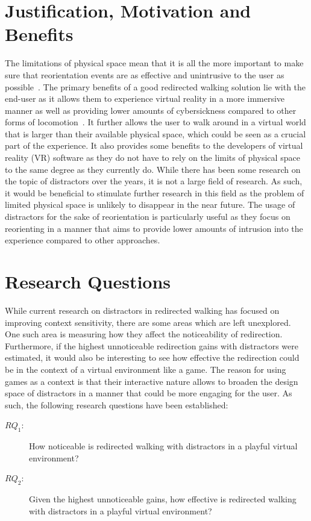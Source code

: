 \section{Justification, Motivation and Benefits}
The limitations of physical space mean that it is all the more important to make sure that reorientation events are as effective and unintrusive to the user as possible~\cite{azmandian2015physical}. The primary benefits of a good redirected walking solution lie with the end-user as it allows them to experience virtual reality in a more immersive manner as well as providing lower amounts of cybersickness compared to other forms of locomotion~\cite{razzaque2001redirected, peck2011evaluation}. It further allows the user to walk around in a virtual world that is larger than their available physical space, which could be seen as a crucial part of the experience. It also provides some benefits to the developers of virtual reality (VR) software as they do not have to rely on the limits of physical space to the same degree as they currently do. While there has been some research on the topic of distractors over the years, it is not a large field of research. As such, it would be beneficial to stimulate further research in this field as the problem of limited physical space is unlikely to disappear in the near future. The usage of distractors for the sake of reorientation is particularly useful as they focus on reorienting in a manner that aims to provide lower amounts of intrusion into the experience compared to other approaches.

\section{Research Questions}\label{research:questions}
While current research on distractors in redirected walking has focused on improving context sensitivity, there are some areas which are left unexplored. One such area is measuring how they affect the noticeability of redirection. Furthermore, if the highest unnoticeable redirection gains with distractors were estimated, it would also be interesting to see how effective the redirection could be in the context of a virtual environment like a game. The reason for using games as a context is that their interactive nature allows to broaden the design space of distractors in a manner that could be more engaging for the user. As such, the following research questions have been established:
\begin{description}
\item[$RQ_1$: ] How noticeable is redirected walking with distractors in a playful virtual environment?
\item[$RQ_2$: ] Given the highest unnoticeable gains, how effective is redirected walking with distractors in a playful virtual environment?
\end{description}


